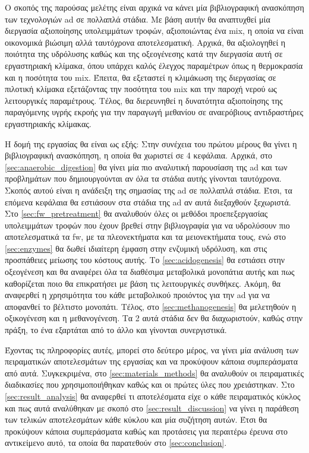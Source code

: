 \documentclass[11pt]{report}
\begin{document}
Ο σκοπός της παρούσας μελέτης είναι αρχικά να κάνει μία βιβλιογραφική ανασκόπηση των τεχνολογιών \acrshort{ad} σε πολλαπλά στάδια. Με βάση αυτήν θα αναπτυχθεί μία διεργασία αξιοποίησης υπολειμμάτων τροφών, αξιοποιώντας ένα \acrfull{mix}, η οποία να είναι οικονομικά βιώσιμη αλλά ταυτόχρονα αποτελεσματική. Αρχικά, θα αξιολογηθεί η ποιότητα της υδρόλυσης καθώς και της οξεογένεσης κατά την διεργασία αυτή σε εργαστηριακή κλίμακα, όπου υπάρχει καλός έλεγχος παραμέτρων όπως η θερμοκρασία και η ποσότητα του \acrshort{mix}. Έπειτα, θα εξεταστεί η κλιμάκωση της διεργασίας σε πιλοτική κλίμακα εξετάζοντας την ποσότητα του \acrshort{mix} και την παροχή νερού ως λειτουργικές παραμέτρους. Τέλος, θα διερευνηθεί η δυνατότητα αξιοποίησης της παραγόμενης υγρής εκροής για την παραγωγή μεθανίου σε αναερόβιους αντιδραστήρες εργαστηριακής κλίμακας.

Η δομή της εργασίας θα είναι ως εξής: Στην συνέχεια του πρώτου μέρους θα γίνει η βιβλιογραφική ανασκόπηση, η οποία θα χωριστεί σε 4 κεφάλαια. Αρχικά, στο \autoref{sec:anaerobic_digestion} θα γίνει μία πιο αναλυτική παρουσίαση της \acrshort{ad} και των προβλημάτων που δημιουργούνται αν όλα τα στάδια αυτής γίνονται ταυτόχρονα. Σκοπός αυτού είναι η ανάδειξη της σημασίας της \acrshort{ad} σε πολλαπλά στάδια. Έτσι, τα επόμενα κεφάλαια θα εστιάσουν στα στάδια της \acrshort{ad} αν αυτά διεξαχθούν ξεχωριστά. Στο \autoref{sec:fw_pretreatment} θα αναλυθούν όλες οι μεθόδοι προεπεξεργασίας υπολειμμάτων τροφών που έχουν βρεθεί στην βιβλιογραφία για να υδρολύσουν πιο αποτελεσματικά τα \acrshort{fw}, με τα πλεονεκτήματα και τα μειονεκτήματα τους, ενώ στο \autoref{sec:enzymes} θα δωθεί ιδιαίτερη έμφαση στην ενζυμική υδρόλυση, και στις προσπάθειες μείωσης του κόστους αυτής. Το \autoref{sec:acidogenesis} θα εστιάσει στην οξεογένεση και θα αναφέρει όλα τα διαθέσιμα μεταβολικά μονοπάτια αυτής και πως καθορίζεται ποιο θα επικρατήσει με βάση τις λειτουργικές συνθήκες. Ακόμη, θα αναφερθεί η χρησιμότητα του κάθε μεταβολικού προιόντος για την \acrshort{ad} για να αποφανθεί το βέλτιστο μονοπάτι. Τέλος, στο \autoref{sec:methanogenesis} θα μελετηθούν η οξικογένεση και η μεθανογένεση. Τα 2 αυτά στάδια δεν θα διαχωριστούν, καθώς στην πράξη, το ένα εξαρτάται από το άλλο και γίνονται συνεργιστικά.

Έχοντας τις πληροφορίες αυτές, μπορεί στο δεύτερο μέρος, να γίνει μία ανάλυση των πειραματικών αποτελεσμάτων της εργασίας και να προκύψουν κάποια συμπεράσματα από αυτά. Συγκεκριμένα, στο \autoref{sec:materials_methods} θα αναλυθούν οι πειραματικές διαδικασίες που χρησιμοποιήθηκαν καθώς και οι πρώτες ύλες που χρειάστηκαν. Στο \autoref{sec:result_analysis} θα αναφερθεί τι αποτελέσματα είχε ο κάθε πειραματικός κύκλος και πως αυτά αναλύθηκαν με σκοπό στο \autoref{sec:result_discussion} να γίνει η παράθεση των τελικών αποτελεσμάτων κάθε κύκλου και μία συζήτηση αυτών. Έτσι θα προκύψουν κάποια συμπεράσματα καθώς και προτάσεις για περαιτέρω έρευνα στο αντικείμενο αυτό, τα οποία θα παρατεθούν στο \autoref{sec:conclusion}.
\end{document}
